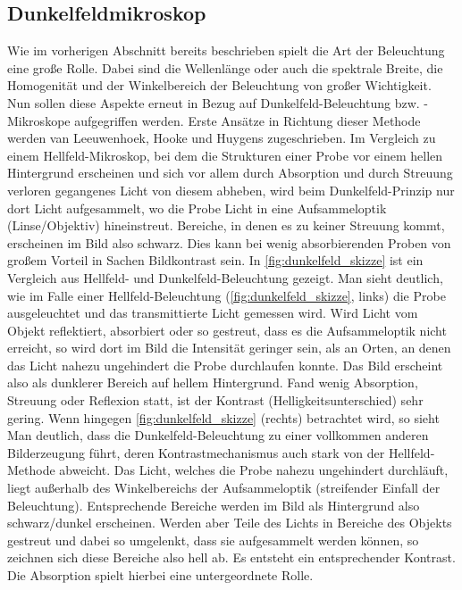 \documentclass[ngerman]{scrartcl}
\begin{document}
\subsection{Dunkelfeldmikroskop}
\label{subsec:dunkelfeldmikroskop_grundlagen}

Wie im vorherigen Abschnitt bereits beschrieben spielt die Art der Beleuchtung eine große Rolle. Dabei sind die Wellenlänge oder auch die spektrale Breite, die Homogenität und der Winkelbereich der Beleuchtung von großer Wichtigkeit. Nun sollen diese Aspekte erneut in Bezug auf Dunkelfeld-Beleuchtung bzw. -Mikroskope aufgegriffen werden. Erste Ansätze in Richtung dieser Methode werden van Leeuwenhoek, Hooke und Huygens zugeschrieben. Im Vergleich zu einem Hellfeld-Mikroskop, bei dem die Strukturen einer Probe vor einem hellen Hintergrund erscheinen und sich vor allem durch Absorption und durch Streuung verloren gegangenes Licht von diesem abheben, wird beim Dunkelfeld-Prinzip nur dort Licht aufgesammelt, wo die Probe Licht in eine Aufsammeloptik (Linse/Objektiv) hineinstreut. Bereiche, in denen es zu keiner Streuung kommt, erscheinen im Bild also schwarz. Dies kann bei wenig absorbierenden Proben von großem Vorteil in Sachen Bildkontrast sein. In \autoref{fig:dunkelfeld_skizze} ist ein Vergleich aus Hellfeld- und Dunkelfeld-Beleuchtung gezeigt. Man sieht deutlich, wie im Falle einer Hellfeld-Beleuchtung (\autoref{fig:dunkelfeld_skizze}, links) die Probe ausgeleuchtet und das transmittierte Licht gemessen wird. Wird Licht vom Objekt reflektiert, absorbiert oder so gestreut, dass es die Aufsammeloptik nicht erreicht, so wird dort im Bild die Intensität geringer sein, als an Orten, an denen das Licht nahezu ungehindert die Probe durchlaufen konnte. Das Bild erscheint also als dunklerer Bereich auf hellem Hintergrund. Fand wenig Absorption, Streuung oder Reflexion statt, ist der Kontrast (Helligkeitsunterschied) sehr gering. Wenn hingegen \autoref{fig:dunkelfeld_skizze} (rechts) betrachtet wird, so sieht Man deutlich, dass die Dunkelfeld-Beleuchtung zu einer vollkommen anderen Bilderzeugung führt, deren Kontrastmechanismus auch stark von der Hellfeld-Methode abweicht. Das Licht, welches die Probe nahezu ungehindert durchläuft, liegt außerhalb des Winkelbereichs der Aufsammeloptik (streifender Einfall der Beleuchtung). Entsprechende Bereiche werden im Bild als Hintergrund also schwarz/dunkel erscheinen. Werden aber Teile des Lichts in Bereiche des Objekts gestreut und dabei so umgelenkt, dass sie aufgesammelt werden können, so zeichnen sich diese Bereiche also hell ab. Es entsteht ein entsprechender Kontrast. Die Absorption spielt hierbei eine untergeordnete Rolle.
\end{document}
